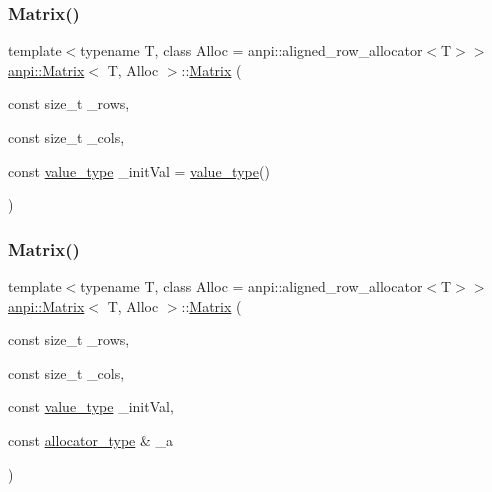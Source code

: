 \mbox{\label{classanpi_1_1Matrix_a64edbb05eacef213f35a6fc73452c66c}} 
\subsubsection{\texorpdfstring{Matrix()}{Matrix()}\hspace{0.1cm}{\footnotesize\ttfamily [5/17]}}
{\footnotesize\ttfamily template$<$typename T, class Alloc = anpi\+::aligned\+\_\+row\+\_\+allocator$<$\+T$>$$>$ \\
\hyperlink{classanpi_1_1Matrix}{anpi\+::\+Matrix}$<$ T, Alloc $>$\+::\hyperlink{classanpi_1_1Matrix}{Matrix} (\begin{DoxyParamCaption}\item[{const size\+\_\+t}]{\+\_\+rows,  }\item[{const size\+\_\+t}]{\+\_\+cols,  }\item[{const \hyperlink{classanpi_1_1Matrix_ad755076524c16fc494a392b0a66065cb}{value\+\_\+type}}]{\+\_\+init\+Val = {\ttfamily \hyperlink{classanpi_1_1Matrix_ad755076524c16fc494a392b0a66065cb}{value\+\_\+type}()} }\end{DoxyParamCaption})\hspace{0.3cm}{\ttfamily [explicit]}}

\mbox{\label{classanpi_1_1Matrix_ad82b357ca27b1ed1046fec80dd9f6495}} 
\subsubsection{\texorpdfstring{Matrix()}{Matrix()}\hspace{0.1cm}{\footnotesize\ttfamily [6/17]}}
{\footnotesize\ttfamily template$<$typename T, class Alloc = anpi\+::aligned\+\_\+row\+\_\+allocator$<$\+T$>$$>$ \\
\hyperlink{classanpi_1_1Matrix}{anpi\+::\+Matrix}$<$ T, Alloc $>$\+::\hyperlink{classanpi_1_1Matrix}{Matrix} (\begin{DoxyParamCaption}\item[{const size\+\_\+t}]{\+\_\+rows,  }\item[{const size\+\_\+t}]{\+\_\+cols,  }\item[{const \hyperlink{classanpi_1_1Matrix_ad755076524c16fc494a392b0a66065cb}{value\+\_\+type}}]{\+\_\+init\+Val,  }\item[{const \hyperlink{classanpi_1_1Matrix_a3574b7528e3ddfb2f7cdf446be8286c1}{allocator\+\_\+type} \&}]{\+\_\+a }\end{DoxyParamCaption})\hspace{0.3cm}{\ttfamily [explicit]}}

